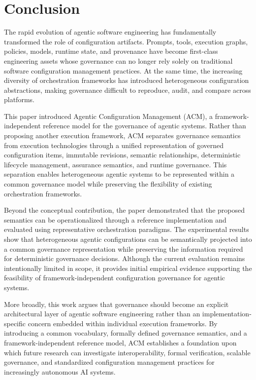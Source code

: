 \documentclass[10pt]{article}
\begin{document}
\section{Conclusion}
\label{sec:conclusion}

The rapid evolution of agentic software engineering has fundamentally transformed the role of configuration artifacts. Prompts, tools, execution graphs, policies, models, runtime state, and provenance have become first-class engineering assets whose governance can no longer rely solely on traditional software configuration management practices. At the same time, the increasing diversity of orchestration frameworks has introduced heterogeneous configuration abstractions, making governance difficult to reproduce, audit, and compare across platforms.

This paper introduced Agentic Configuration Management (ACM), a framework-independent reference model for the governance of agentic systems. Rather than proposing another execution framework, ACM separates governance semantics from execution technologies through a unified representation of governed configuration items, immutable revisions, semantic relationships, deterministic lifecycle management, assurance semantics, and runtime governance. This separation enables heterogeneous agentic systems to be represented within a common governance model while preserving the flexibility of existing orchestration frameworks.

Beyond the conceptual contribution, the paper demonstrated that the proposed semantics can be operationalized through a reference implementation and evaluated using representative orchestration paradigms. The experimental results show that heterogeneous agentic configurations can be semantically projected into a common governance representation while preserving the information required for deterministic governance decisions. Although the current evaluation remains intentionally limited in scope, it provides initial empirical evidence supporting the feasibility of framework-independent configuration governance for agentic systems.

More broadly, this work argues that governance should become an explicit architectural layer of agentic software engineering rather than an implementation-specific concern embedded within individual execution frameworks. By introducing a common vocabulary, formally defined governance semantics, and a framework-independent reference model, ACM establishes a foundation upon which future research can investigate interoperability, formal verification, scalable governance, and standardized configuration management practices for increasingly autonomous AI systems.
\end{document}

